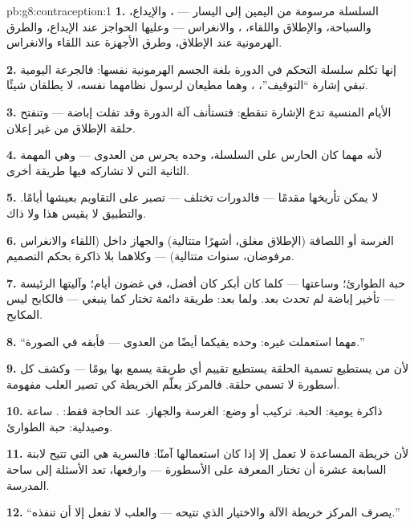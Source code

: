 \begin{solution}{pb:g8:contraception:1}
\textbf{1.} السلسلة مرسومة من اليمين إلى اليسار ---
، والإيداع، والسباحة، والإطلاق واللقاء،
، والانغراس --- وعليها الحواجز عند الإيداع،
والطرق الهرمونية عند الإطلاق، وطرق الأجهزة عند اللقاء
والانغراس.

\textbf{2.} إنها تكلم سلسلة التحكم في الدورة بلغة الجسم
الهرمونية نفسها: فالجرعة اليومية تبقي إشارة ``التوقيف''،
، وهما مطيعان لرسول نظامهما نفسه، لا يطلقان
شيئًا.

\textbf{3.} الأيام المنسية تدع الإشارة تنقطع: فتستأنف
آلة الدورة وقد تفلت إباضة --- وتنفتح حلقة الإطلاق من غير
إعلان.

\textbf{4.} لأنه مهما كان الحارس على السلسلة، 
وحده يحرس من العدوى --- وهي المهمة الثانية التي لا
تشاركه فيها طريقة أخرى.

\textbf{5.}  لا يمكن تأريخها مقدمًا --- فالدورات
تختلف ---  تصبر على التقاويم بعيشها أيامًا.
والتطبيق لا يقيس هذا ولا ذاك.

\textbf{6.} الغرسة أو اللصاقة (الإطلاق مغلق، أشهرًا
متتالية) والجهاز داخل  (اللقاء والانغراس مرفوضان،
سنوات متتالية) --- وكلاهما بلا ذاكرة بحكم التصميم.

\textbf{7.} حبة الطوارئ؛ وساعتها --- كلما كان أبكر كان
أفضل، في غضون أيام؛ وآليتها الرئيسة --- تأخير إباضة لم
تحدث بعد. ولما بعد: طريقة دائمة تختار كما ينبغي ---
فالكابح ليس المكابح.

\textbf{8.} ``مهما استعملت غيره:  وحده يقيكما
أيضًا من العدوى --- فأبقه في الصورة.''

\textbf{9.} لأن من يستطيع تسمية الحلقة يستطيع تقييم أي
طريقة يسمع بها يومًا --- وكشف كل أسطورة لا تسمي حلقة.
فالمركز يعلّم الخريطة كي تصير العلب مفهومة.

\textbf{10.} ذاكرة يومية: الحبة. تركيب أو وضع: الغرسة
والجهاز. عند الحاجة فقط: . ساعة وصيدلية: حبة
الطوارئ.

\textbf{11.} لأن خريطة المساعدة لا تعمل إلا إذا كان
استعمالها آمنًا: فالسرية هي التي تتيح لابنة السابعة
عشرة أن تختار المعرفة على الأسطورة --- وارفعها، تعد
الأسئلة إلى ساحة المدرسة.

\textbf{12.} ``يصرف المركز خريطة الآلة والاختيار الذي
تتيحه --- والعلب لا تفعل إلا أن تنفذه.''
\end{solution}
